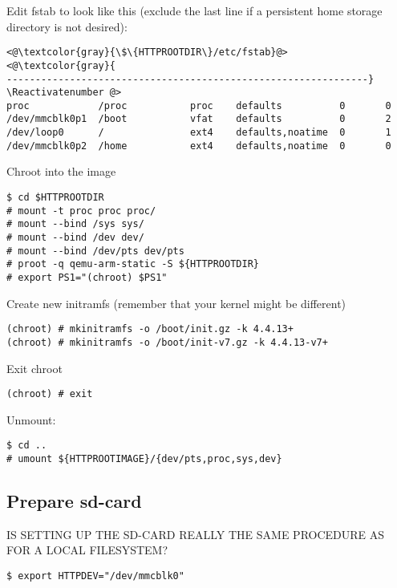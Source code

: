Edit fstab to look like this (exclude the last line if a persistent
home storage directory is not desired):
\Suppressnumber\begin{lstlisting}[]
<@\textcolor{gray}{\$\{HTTPROOTDIR\}/etc/fstab}@>
<@\textcolor{gray}{
---------------------------------------------------------------}
\Reactivatenumber @>
proc            /proc           proc    defaults          0       0
/dev/mmcblk0p1  /boot           vfat    defaults          0       2
/dev/loop0      /               ext4    defaults,noatime  0       1
/dev/mmcblk0p2  /home           ext4    defaults,noatime  0       0
\end{lstlisting}
\FloatBarrier
\vspace{-5mm}


Chroot into the image
\begin{lstlisting}[]
$ cd $HTTPROOTDIR
# mount -t proc proc proc/
# mount --bind /sys sys/
# mount --bind /dev dev/
# mount --bind /dev/pts dev/pts
# proot -q qemu-arm-static -S ${HTTPROOTDIR}
# export PS1="(chroot) $PS1"
\end{lstlisting}
\FloatBarrier
\vspace{-5mm}


Create new initramfs (remember that your kernel might be different)
\begin{lstlisting}[]
(chroot) # mkinitramfs -o /boot/init.gz -k 4.4.13+
(chroot) # mkinitramfs -o /boot/init-v7.gz -k 4.4.13-v7+
\end{lstlisting}
\FloatBarrier
\vspace{-5mm}

Exit chroot
\begin{lstlisting}[]
(chroot) # exit
\end{lstlisting}
\FloatBarrier
\vspace{-5mm}

Unmount:
\begin{lstlisting}[]
$ cd ..
# umount ${HTTPROOTIMAGE}/{dev/pts,proc,sys,dev}
\end{lstlisting}
\FloatBarrier
\vspace{-5mm}


\subsection{Prepare sd-card}

IS SETTING UP THE SD-CARD REALLY THE SAME PROCEDURE AS FOR A LOCAL FILESYSTEM?

\begin{lstlisting}[]
$ export HTTPDEV="/dev/mmcblk0"
\end{lstlisting}
\FloatBarrier
\vspace{-5mm}

